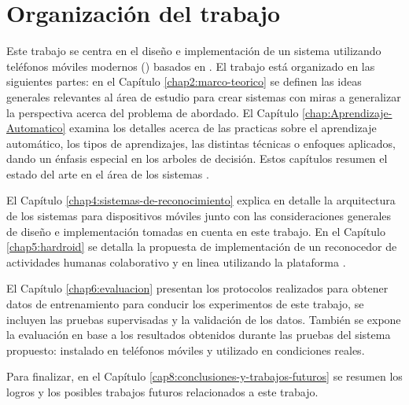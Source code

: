 \section{Organización del trabajo}

\label{sec14:organizaciuxf3n-del-trabajo}Este trabajo se centra en
el diseño e implementación de un sistema  utilizando teléfonos
móviles modernos () basados en .
El trabajo está organizado en las siguientes partes: en el Capítulo
\ref{chap2:marco-teorico} se definen las ideas generales relevantes
al área de estudio para crear sistemas  con miras a generalizar
la perspectiva acerca del problema de abordado. El Capítulo \ref{chap:Aprendizaje-Automatico}
examina los detalles acerca de las practicas sobre el aprendizaje
automático, los tipos de aprendizajes, las distintas técnicas o enfoques
aplicados, dando un énfasis especial en los arboles de decisión. Estos
capítulos resumen el estado del arte en el área de los sistemas .

El Capítulo \ref{chap4:sistemas-de-reconocimiento} explica en detalle
la arquitectura de los sistemas  para dispositivos móviles
junto con las consideraciones generales de diseño e implementación
tomadas en cuenta en este trabajo. En el Capítulo \ref{chap5:hardroid}
se detalla la propuesta de implementación de un reconocedor de actividades
humanas colaborativo y en linea utilizando la plataforma .

El Capítulo \ref{chap6:evaluacion} presentan los protocolos realizados
para obtener datos de entrenamiento para conducir los experimentos
de este trabajo, se incluyen las pruebas supervisadas y la validación
de los datos. También se expone la evaluación en base a los resultados
obtenidos durante las pruebas del sistema  propuesto: instalado
en teléfonos móviles y utilizado en condiciones reales. 

Para finalizar, en el Capítulo \ref{cap8:conclusiones-y-trabajos-futuros}
se resumen los logros y los posibles trabajos futuros relacionados
a este trabajo. 
